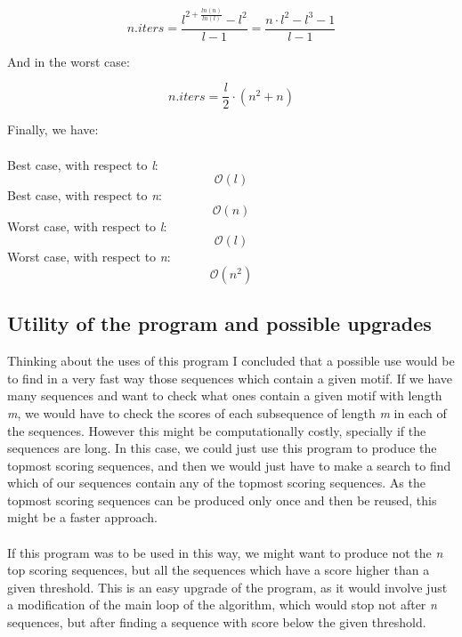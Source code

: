\documentclass{article}
\begin{document}
\begin{equation} \label{eq:best_case_all_iters}
  n.iters = \frac{l^{
  					 2 + \frac{ln(n)}
  					 	 	  {ln(l)}}
  					 - l^2}
  			      {l-1} = \frac{n \cdot l^2 - l^3 - 1}
  			      			   {l - 1}
\end{equation}

And in the worst case:

\begin{equation} \label{eq:worst_case_all_iters}
  n.iters = \frac{l}{2} \cdot (n^2 + n)
\end{equation}

Finally, we have:\\
\\
Best case, with respect to \emph{l}:
\begin{equation}
\mathcal{O}(l)
\end{equation}
Best case, with respect to \emph{n}:
\begin{equation}
\mathcal{O}(n)
\end{equation}
Worst case, with respect to \emph{l}:
\begin{equation}
\mathcal{O}(l)
\end{equation}
Worst case, with respect to \emph{n}:
\begin{equation}
\mathcal{O}(n^2)
\end{equation}

\subsection{Utility of the program and possible upgrades} \label{upgrades}
Thinking about the uses of this program I concluded that a possible use would be to find in a very fast way those sequences which contain a given motif. If we have many sequences and want to check what ones contain a given motif with length \emph{m}, we would have to check the scores of each subsequence of length \emph{m} in each of the sequences. However this might be computationally costly, specially if the sequences are long. In this case, we could just use this program to produce the topmost scoring sequences, and then we would just have to make a search to find which of our sequences contain any of the topmost scoring sequences. As the topmost scoring sequences can be produced only once and then be reused, this might be a faster approach.\\
\\
If this program was to be used in this way, we might want to produce not the \emph{n} top scoring sequences, but all the sequences which have a score higher than a given threshold. This is an easy upgrade of the program, as it would involve just a modification of the main loop of the algorithm, which would stop not after \emph{n} sequences, but after finding a sequence with score below the given threshold.
\end{document}
